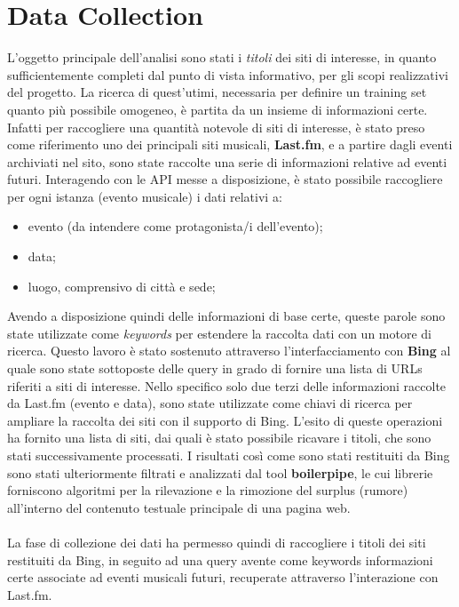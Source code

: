 \documentclass[a4paper]{report}
\begin{document}
\section{Data Collection}
L'oggetto principale dell'analisi sono stati i \textit{titoli} dei siti di interesse, in quanto sufficientemente completi dal punto di vista informativo, per gli scopi realizzativi del progetto. La ricerca di quest'utimi, necessaria per definire un training set quanto più possibile omogeneo, è partita da un insieme di informazioni certe. Infatti per raccogliere una quantità notevole di siti di interesse, è stato preso come riferimento uno dei principali siti musicali, \textbf{Last.fm}\cite{6}, e a partire dagli eventi archiviati nel sito, sono state raccolte una serie di informazioni relative ad eventi futuri. Interagendo con le API messe a disposizione, è stato possibile raccogliere per ogni istanza (evento musicale) i dati relativi a:
\begin{itemize}
\item evento (da intendere come protagonista/i dell'evento);
\item data;
\item luogo, comprensivo di città e sede;
\end{itemize}
Avendo a disposizione quindi delle informazioni di base certe, queste parole sono state utilizzate come \textit{keywords} per estendere la raccolta dati con un motore di ricerca. Questo lavoro è stato sostenuto attraverso l'interfacciamento con \textbf{Bing} al quale sono state sottoposte delle query in grado di fornire una lista di URLs riferiti a siti di interesse. Nello specifico solo due terzi delle informazioni raccolte da Last.fm (evento e data), sono state utilizzate come chiavi di ricerca per ampliare la raccolta dei siti con il supporto di Bing. L'esito di queste operazioni ha fornito una lista di siti, dai quali è stato possibile ricavare i titoli, che sono stati successivamente processati. I risultati così come sono stati restituiti da Bing sono stati ulteriormente filtrati e analizzati dal tool \textbf{boilerpipe}\cite{7}, le cui librerie forniscono algoritmi per la rilevazione e la rimozione del surplus (rumore) all'interno del contenuto testuale principale di una pagina web. \\
\\
La fase di collezione dei dati ha permesso quindi di raccogliere i titoli dei siti restituiti da Bing, in seguito ad una query avente come keywords informazioni certe associate ad eventi musicali futuri, recuperate attraverso l'interazione con Last.fm.
\end{document}
